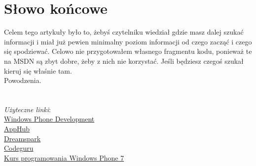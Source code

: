 \documentclass[12pt, a4paper]{article}
\begin{document}
\section{Słowo końcowe}
Celem tego artykuły było to, żebyś czytelniku wiedział gdzie masz dalej szukać
informacji i miał już pewien minimalny poziom informacji od czego zacząć i
czego się spodziewać. Celowo nie przygotowałem własnego fragmentu kodu, ponieważ
te na MSDN są zbyt dobre, żeby z nich nie korzystać. Jeśli będziesz czegoś
szukał kieruj się właśnie tam.\\
Powodzenia.
\\\\\\
\emph{Użyteczne linki}:\\
\href{http://msdn.microsoft.com/en-us/library/ff402535%28v=vs.92%29}{Windows
 Phone Development}\\
\href{http://create.msdn.com/en-US/}{AppHub}\\
\href{https://www.dreamspark.com/}{Dreamspark}\\
\href{http://www.codeguru.pl/}{Codeguru}\\
\href{http://channel9.msdn.com/Series/Kurs-programowania-Windows-Phone-7}{Kurs
programowania Windows Phone 7}\\
\end{document}
